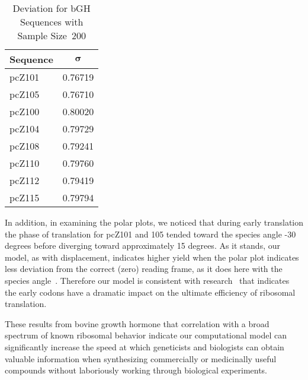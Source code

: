 \documentclass[12pt, draft]{article}
\numberwithin{equation}{section}
\begin{document}
\begin{table}[tbp]
\begin{center}
    \begin{tabular}{lc}
        \toprule
        \textbf{Sequence} & $\mathbf{\sigma}$\\
        \midrule
        pcZ101 & 0.76719\\
        pcZ105 & 0.76710\\
        \midrule
        pcZ100 & 0.80020\\
        pcZ104 & 0.79729\\
        pcZ108 & 0.79241\\
        pcZ110 & 0.79760\\
        pcZ112 & 0.79419\\
        pcZ115 & 0.79794\\
        \bottomrule
    \end{tabular}
    \caption{Deviation for bGH Sequences with Sample Size~200}
    \label{bgh:deviation}
\end{center}
\end{table}

In addition, in examining the polar plots, we noticed that during
early translation the phase of translation for pcZ101 and 105 tended toward the species
angle -30 degrees before diverging toward approximately 15 degrees. As
it stands, our model, as with displacement, indicates higher yield when the polar plot
indicates less deviation from the correct (zero) reading frame, as it
does here with the species angle~\cite{lalit:mechanics}. Therefore our
model is consistent with research~\cite{bgh:initiation} that indicates
the early codons have a dramatic impact on the ultimate efficiency of
ribosomal translation.

These results from bovine growth hormone that correlation with a broad
spectrum of known ribosomal behavior indicate our computational model
can significantly increase the speed at which geneticists and
biologists can obtain valuable information when synthesizing
commercially or medicinally useful compounds without laboriously
working through biological experiments.

\begin{singlespace}
  
\end{singlespace}
\end{document}
